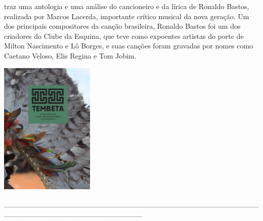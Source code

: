 \medskip

 traz uma antologia e uma análise do cancioneiro e da lírica de Ronaldo Bastos, realizada por Marcos Lacerda, importante crítico musical da nova geração. Um dos principais compositores da canção brasileira, Ronaldo Bastos foi um dos criadores do Clube da Esquina, que teve como expoentes artistas do porte de Milton Nascimento e Lô Borges, e suas canções foram gravadas por nomes como Caetano Veloso, Elis Regina e Tom Jobim.

\vfill

\hspace*{-.4cm}\begin{minipage}[c]{0.90\linewidth}
\small{
{}}
\end{minipage}

\pagebreak

\hspace{.5cm}

\begin{center}
\hspace*{-2.5cm}
\hspace*{2cm}\includegraphics[width=45mm]{./imgs/tembeta.jpg}
\end{center}

\hspace*{-2cm}\_\_\_\_\_\_\_\_\_\_\_\_\_\_\_\_\_\_\_\_\_\_\_\_\_\_\_\_\_\_\_\_\_\_\_\_\_\_\_\_\_\_\_\_\_\_\_\_\_\_\_\_\_\_\_\_\_\_\_\_\_\_\_\_\_\_\_\_\_\_\_\_\_\_

